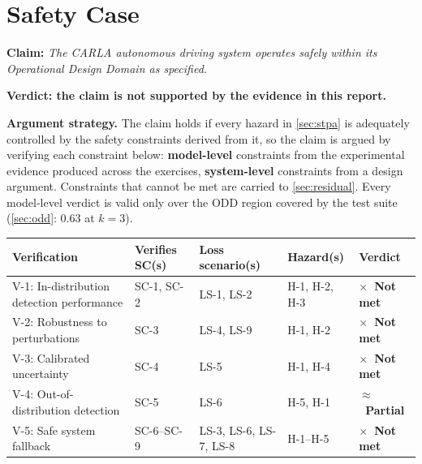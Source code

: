 \documentclass[a4paper,12pt]{article}
\makeatletter
\newcommand{\verdictnotmet}{\textbf{\color{mls@red}$\times$~Not met}}
\newcommand{\verdictpartial}{\textbf{\color{mls@yellow}$\approx$~Partial}}
\makeatother
\begin{document}
\clearpage
\section{Safety Case}
\label{sec:safety-case}

\begin{mdframed}[style=claimstyle]
\textbf{Claim:}
\textit{The CARLA autonomous driving system operates safely within its Operational Design Domain as specified.}

\medskip
\textbf{Verdict: the claim is not supported by the evidence in this report.}
\end{mdframed}

\begin{mdframed}[style=subclaim]
\textbf{Argument strategy.}
The claim holds if every hazard in \cref{sec:stpa} is adequately controlled by the safety
constraints derived from it, so the claim is argued by verifying each constraint below:
\textbf{model-level} constraints from the experimental evidence produced across the
exercises, \textbf{system-level} constraints from a design argument. Constraints that
cannot be met are carried to \cref{sec:residual}. Every model-level verdict is valid only
over the ODD region covered by the test suite (\cref{sec:odd}: $0.63$ at $k=3$).
\end{mdframed}

\begin{center}
\small
\begin{tabularx}{\linewidth}{@{}X P{2.1cm} P{2.1cm} P{1.9cm} P{1.9cm}@{}}
\toprule
\textbf{Verification}
& \textbf{Verifies SC(s)}
& \textbf{Loss scenario(s)}
& \textbf{Hazard(s)}
& \textbf{Verdict} \\
\midrule
V-1: In-distribution detection performance
& SC-1, SC-2 & LS-1, LS-2 & H-1, H-2, H-3 & \verdictnotmet \\
V-2: Robustness to perturbations
& SC-3 & LS-4, LS-9 & H-1, H-2 & \verdictnotmet \\
V-3: Calibrated uncertainty
& SC-4 & LS-5 & H-1, H-4 & \verdictnotmet \\
V-4: Out-of-distribution detection
& SC-5 & LS-6 & H-5, H-1 & \verdictpartial \\
V-5: Safe system fallback
& SC-6--SC-9 & LS-3, LS-6, LS-7, LS-8 & H-1--H-5 & \verdictnotmet \\
\bottomrule
\end{tabularx}
\end{center}

\end{document}
